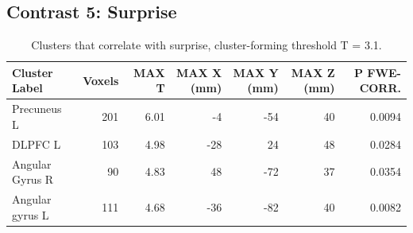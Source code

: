 \subsection{Contrast 5: Surprise}

\begin{table}[htbp]
    \centering
    \begin{threeparttable}
    \caption{Clusters that correlate with surprise, cluster-forming threshold T = 3.1.}
    \label{tab:con5}%
    \begin{tabularx}{\textwidth}{l *{6}{R}}
        \toprule
        \textbf{Cluster Label} & \textbf{Voxels} & \textbf{MAX T} & \textbf{MAX X (mm)} & \textbf{MAX Y (mm}) & \textbf{MAX Z (mm)} & \textbf{P FWE-CORR.} \\
        \midrule
        Precuneus L & 201 & 6.01 & -4 & -54 & 40 & 0.0094 \\ %
DLPFC L & 103 & 4.98 & -28 & 24 & 48 & 0.0284\\ %
Angular Gyrus R & 90 & 4.83 & 48 & -72 & 37 & 0.0354 \\ %
Angular gyrus L & 111 & 4.68 & -36 & -82 & 40 & 0.0082 \\ %
        \bottomrule
        \end{tabularx}
        \end{threeparttable}
\end{table}%